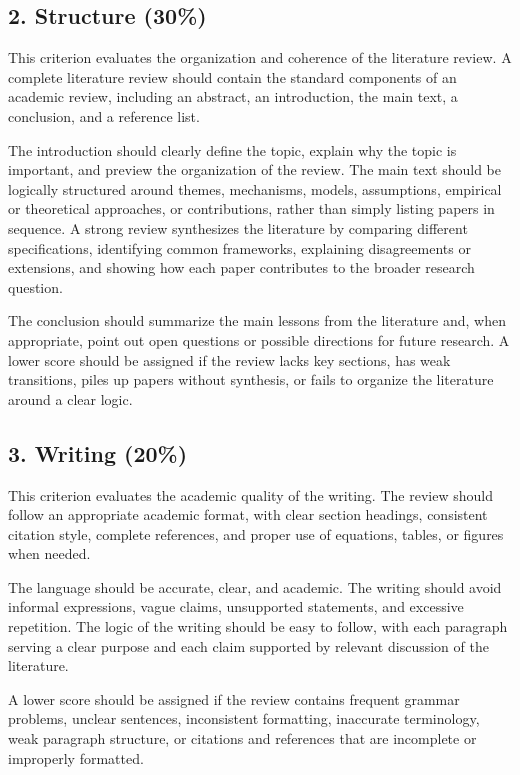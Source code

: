 \documentclass[12pt]{article}
\begin{document}
\subsection*{2. Structure \texorpdfstring{(30\%)}{}}

This criterion evaluates the organization and coherence of the literature review. A complete literature review should contain the standard components of an academic review, including an abstract, an introduction, the main text, a conclusion, and a reference list.

The introduction should clearly define the topic, explain why the topic is important, and preview the organization of the review. The main text should be logically structured around themes, mechanisms, models, assumptions, empirical or theoretical approaches, or contributions, rather than simply listing papers in sequence. A strong review synthesizes the literature by comparing different specifications, identifying common frameworks, explaining disagreements or extensions, and showing how each paper contributes to the broader research question.

The conclusion should summarize the main lessons from the literature and, when appropriate, point out open questions or possible directions for future research. A lower score should be assigned if the review lacks key sections, has weak transitions, piles up papers without synthesis, or fails to organize the literature around a clear logic.

\subsection*{3. Writing \texorpdfstring{(20\%)}{}}

This criterion evaluates the academic quality of the writing. The review should follow an appropriate academic format, with clear section headings, consistent citation style, complete references, and proper use of equations, tables, or figures when needed.

The language should be accurate, clear, and academic. The writing should avoid informal expressions, vague claims, unsupported statements, and excessive repetition. The logic of the writing should be easy to follow, with each paragraph serving a clear purpose and each claim supported by relevant discussion of the literature.

A lower score should be assigned if the review contains frequent grammar problems, unclear sentences, inconsistent formatting, inaccurate terminology, weak paragraph structure, or citations and references that are incomplete or improperly formatted.
\end{document}
